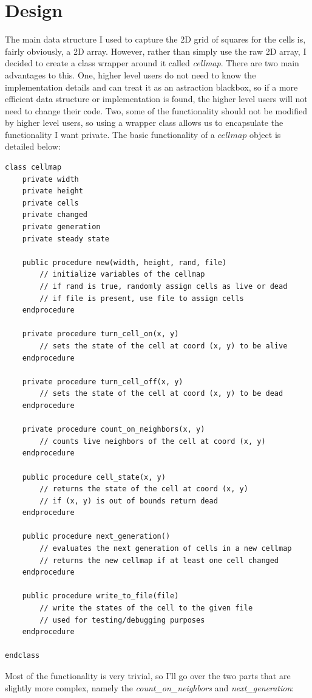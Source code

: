 \documentclass[12pt]{report}
\begin{document}
\chapter{Design}
The main data structure I used to capture the 2D grid of squares for the cells is, fairly obviously, a 2D array.
However, rather than simply use the raw 2D array, I decided to create a class wrapper around it called \emph{cellmap}.
There are two main advantages to this. One, higher level users do not need to know the implementation details and can treat
it as an astraction blackbox, so if a more efficient data structure or implementation is found, 
the higher level users will not need to change their code.
Two, some of the functionality should not be modified by higher level users, so using a wrapper class allows us to encapsulate the functionality I want private.
The basic functionality of a $cellmap$ object is detailed below:
\begin{verbatim}
class cellmap
    private width
    private height
    private cells
    private changed
    private generation
    private steady state

    public procedure new(width, height, rand, file)
        // initialize variables of the cellmap 
        // if rand is true, randomly assign cells as live or dead
        // if file is present, use file to assign cells
    endprocedure

    private procedure turn_cell_on(x, y)
        // sets the state of the cell at coord (x, y) to be alive
    endprocedure

    private procedure turn_cell_off(x, y)
        // sets the state of the cell at coord (x, y) to be dead
    endprocedure

    private procedure count_on_neighbors(x, y)
        // counts live neighbors of the cell at coord (x, y)
    endprocedure

    public procedure cell_state(x, y)
        // returns the state of the cell at coord (x, y)
        // if (x, y) is out of bounds return dead
    endprocedure

    public procedure next_generation()
        // evaluates the next generation of cells in a new cellmap
        // returns the new cellmap if at least one cell changed
    endprocedure

    public procedure write_to_file(file)
        // write the states of the cell to the given file
        // used for testing/debugging purposes
    endprocedure

endclass
\end{verbatim}
Most of the functionality is very trivial, so I'll go over the two parts that are slightly more complex,
namely the \emph{count\_on\_neighbors} and \emph{next\_generation}:\\
\end{document}
